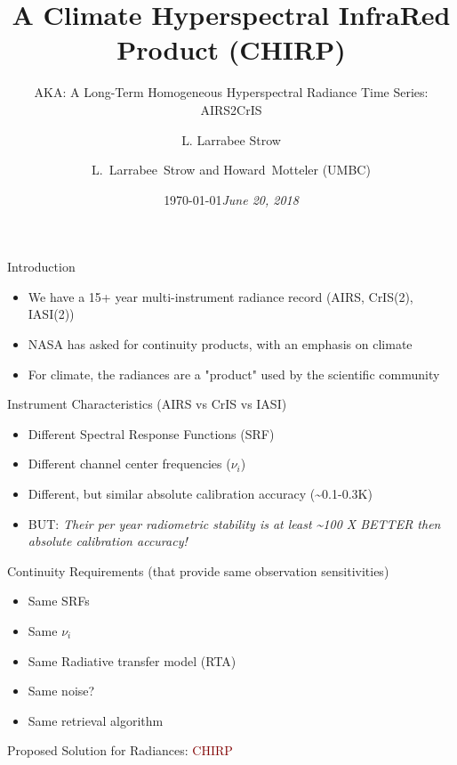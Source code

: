 \documentclass[10pt,t]{beamer}
\author{L. Larrabee Strow}
\date{\today}
\title{\large A Climate Hyperspectral InfraRed Product (CHIRP)}
\date{\textit{\footnotesize June 20, 2018}}
\subtitle{\footnotesize AKA:  A Long-Term Homogeneous Hyperspectral Radiance Time Series: AIRS2CrIS}
\author{L.~Larrabee~Strow and Howard~Motteler (UMBC)}
\begin{document}
\maketitle
{}

\begin{frame}[shrink=20,label={sec:orgc6439ed}]{Introduction}
\vspace{-0.1in}

\begin{itemize}
\item We have a 15+ year multi-instrument radiance record (AIRS, CrIS(2), IASI(2))
\item NASA has asked for continuity products, with an emphasis on climate
\item For climate, the radiances are a "product" used by the scientific community
\end{itemize}
\begin{block}{Instrument Characteristics (AIRS vs CrIS vs IASI)}
\begin{itemize}
\item Different Spectral Response Functions (SRF)
\item Different channel center frequencies (\(\nu_i\))
\item Different, but similar absolute calibration accuracy (\textasciitilde{}0.1-0.3K)
\item BUT: \emph{Their per year radiometric stability is at least \textasciitilde{}100 X \alert{BETTER} then absolute calibration accuracy!}
\end{itemize}
\end{block}
\begin{block}{Continuity Requirements (that provide same observation sensitivities)}
\begin{itemize}
\item Same SRFs
\item Same \(\nu_i\)
\item Same Radiative transfer model (RTA)
\item Same noise?
\item Same retrieval algorithm
\end{itemize}

\large Proposed Solution for Radiances: \textcolor{maroon}{CHIRP}
\end{block}
\end{frame}
\end{document}
